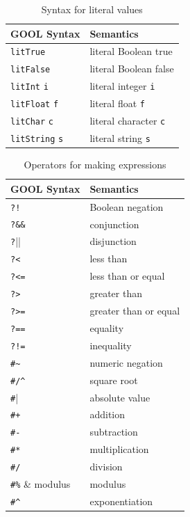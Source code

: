 \documentclass[sigplan,review,anonymous,prologue,dvipsnames]{acmart}
\begin{document}
\begin{table}[!h]
  \caption{Syntax for literal values}
  \begin{tabular}{p{} p{}}
    \textbf{GOOL Syntax} & \textbf{Semantics} \\
    \midrule
    \verb|litTrue| & literal Boolean true \\
    \verb|litFalse| & literal Boolean false \\
    \verb|litInt| \verb|i| & literal integer \verb|i| \\
    \verb|litFloat| \verb|f| & literal float \verb|f| \\
    \verb|litChar| \verb|c| & literal character \verb|c| \\
    \verb|litString| \verb|s| & literal string \verb|s| \\
  \end{tabular}
  \label{tab:literals}
\end{table}

\begin{table}[!h]
  \caption{Operators for making expressions}
  \begin{tabular}{p{} p{}}
    \textbf{GOOL Syntax} & \textbf{Semantics} \\
    \midrule
    \verb|?!| & Boolean negation \\
    \verb|?&&| & conjunction \\
    \verb|?||| & disjunction \\
    \verb|?<| & less than \\
    \verb|?<=| & less than or equal \\
    \verb|?>| & greater than \\
    \verb|?>=| & greater than or equal \\
    \verb|?==| & equality \\
    \verb|?!=| & inequality \\
    \verb|#~| & numeric negation \\
    \verb|#/^| & square root \\
    \verb|#|| & absolute value \\
    \verb|#+| & addition \\
    \verb|#-| & subtraction \\
    \verb|#*| & multiplication \\
    \verb|#/| & division \\
    \verb|#%| & modulus \\
    \verb|#^| & exponentiation \\
  \end{tabular}
  \label{tab:operators}
\end{table}
\end{document}
